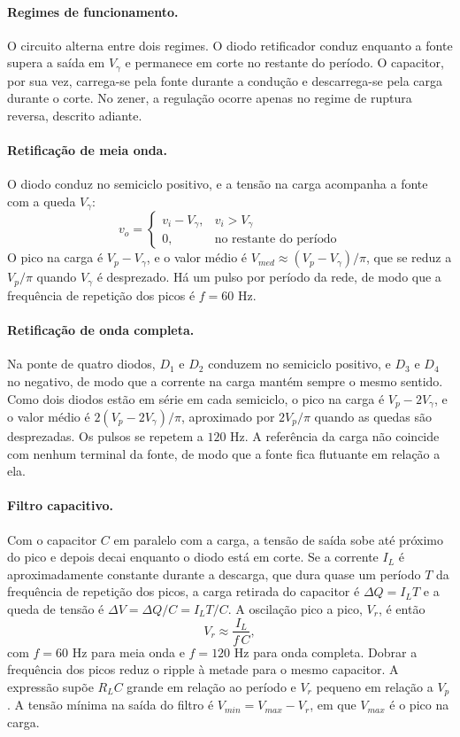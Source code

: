 \documentclass[11pt,a4paper]{article}
\begin{document}
\paragraph{Regimes de funcionamento.} O circuito alterna entre dois regimes. O diodo retificador conduz enquanto a fonte supera a saída em $V_\gamma$ e permanece em corte no restante do período. O capacitor, por sua vez, carrega-se pela fonte durante a condução e descarrega-se pela carga durante o corte. No zener, a regulação ocorre apenas no regime de ruptura reversa, descrito adiante.

\paragraph{Retificação de meia onda.} O diodo conduz no semiciclo positivo, e a tensão na carga acompanha a fonte com a queda $V_\gamma$:
\[
v_o =
\begin{cases}
v_i - V_\gamma, & v_i > V_\gamma \\
0, & \text{no restante do período}
\end{cases}
\]
O pico na carga é $V_p - V_\gamma$, e o valor médio é $V_{med} \approx (V_p - V_\gamma)/\pi$, que se reduz a $V_p/\pi$ quando $V_\gamma$ é desprezado. Há um pulso por período da rede, de modo que a frequência de repetição dos picos é $f = 60\text{ Hz}$.

\paragraph{Retificação de onda completa.} Na ponte de quatro diodos, $D_1$ e $D_2$ conduzem no semiciclo positivo, e $D_3$ e $D_4$ no negativo, de modo que a corrente na carga mantém sempre o mesmo sentido. Como dois diodos estão em série em cada semiciclo, o pico na carga é $V_p - 2V_\gamma$, e o valor médio é $2(V_p - 2V_\gamma)/\pi$, aproximado por $2V_p/\pi$ quando as quedas são desprezadas. Os pulsos se repetem a $120\text{ Hz}$. A referência da carga não coincide com nenhum terminal da fonte, de modo que a fonte fica flutuante em relação a ela.

\paragraph{Filtro capacitivo.} Com o capacitor $C$ em paralelo com a carga, a tensão de saída sobe até próximo do pico e depois decai enquanto o diodo está em corte. Se a corrente $I_L$ é aproximadamente constante durante a descarga, que dura quase um período $T$ da frequência de repetição dos picos, a carga retirada do capacitor é $\Delta Q = I_L T$ e a queda de tensão é $\Delta V = \Delta Q / C = I_L T / C$. A oscilação pico a pico, $V_r$, é então
\begin{equation}
V_r \approx \frac{I_L}{f\,C},
\label{eq:ripple}
\end{equation}
com $f = 60\text{ Hz}$ para meia onda e $f = 120\text{ Hz}$ para onda completa. Dobrar a frequência dos picos reduz o ripple à metade para o mesmo capacitor. A expressão supõe $R_L C$ grande em relação ao período e $V_r$ pequeno em relação a $V_p$. A tensão mínima na saída do filtro é $V_{min} = V_{max} - V_r$, em que $V_{max}$ é o pico na carga.
\end{document}
